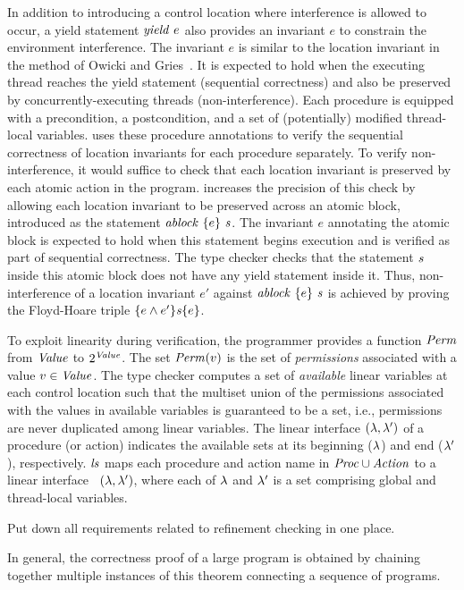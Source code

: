 In addition to introducing a control location where interference is allowed to occur, 
a yield statement $\mathit{yield}\ e$ also provides an invariant $e$ 
to constrain the environment interference.
The invariant $e$ is similar to the location invariant in the method of Owicki and Gries~\cite{OwickiG76}.
It is expected to hold when the executing thread reaches the yield statement (sequential correctness) 
and also be preserved by concurrently-executing threads (non-interference).
Each procedure is equipped with a precondition, a postcondition,
and a set of (potentially) modified thread-local variables.
\civl uses these procedure annotations to verify the sequential correctness of location invariants for each
procedure separately.
To verify non-interference, it would suffice to check that each location invariant is preserved by each atomic action in the program.
\civl increases the precision of this check by allowing each location invariant to be preserved across 
an atomic block, introduced as the statement $\mathit{ablock}\ {\{e\}}\ {\mathit{s}}$.
The invariant $e$ annotating the atomic block is expected to hold when this statement begins execution and is verified as part of sequential correctness.
The \civl type checker checks that the statement $\mathit{s}$ inside this atomic block does not have any yield statement inside it.
Thus, non-interference of a location invariant $e'$ against $\mathit{ablock}\ {\{e\}}\ {\mathit{s}}$ is achieved by proving the Floyd-Hoare triple $\{e \wedge e'\}\mathit{s}\{e\}$.

To exploit linearity during verification, the programmer provides a function $\mathit{Perm}$ from $\mathit{Value}$ to $2^{\mathit{Value}}$.
The set $\mathit{Perm}(v)$ is the set of {\em permissions\/} associated with a value $v \in \mathit{Value}$.
The \civl type checker computes a set of {\em available\/} linear variables at each control location such that
the multiset union of the permissions associated with the values in available variables is guaranteed to be a set, i.e., 
permissions are never duplicated among linear variables.
The linear interface $(\lambda, \lambda')$ of a procedure (or action) indicates the available sets
at its beginning ($\lambda$) and end ($\lambda'$), respectively.
$\mathit{ls}$ maps each procedure and action name in $\mathit{Proc} \cup \mathit{Action}$ to a linear interface~\cite{Wadler90lineartypes}
$(\lambda,\lambda')$, where each of $\lambda$ and $\lambda'$ is a set comprising global and thread-local variables.

Put down all requirements related to refinement checking in one place.

In general, the correctness proof of a large program is obtained by chaining together
multiple instances of this theorem connecting a sequence of programs.  



